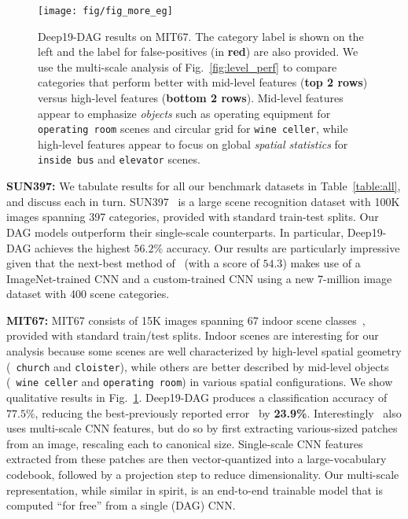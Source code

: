 \documentclass[10pt,twocolumn,letterpaper]{article}
\newcommand{\songfan}[1]{\textcolor{blue}{[Songfan: #1]}}
\begin{document}


\begin{figure}[t!]
\centering
	\texttt{[image: fig/fig\_more\_eg]}
\caption{Deep19-DAG results on MIT67. The category label is shown on the left and the label for false-positives (in {\bf red}) are also provided. We use the multi-scale analysis of Fig.~\ref{fig:level_perf} to compare categories that perform better with mid-level features ({\bf top 2 rows}) versus high-level features ({\bf bottom 2 rows}). Mid-level features appear to emphasize \textit{objects} such as operating equipment for {\tt operating room} scenes and circular grid for {\tt  wine celler}, while high-level features appear to focus on global \textit{spatial statistics} for {\tt inside bus} and {\tt elevator} scenes. }%
\label{fig:more_eg}
\end{figure}

{\bf SUN397:} We tabulate results for all our benchmark datasets in Table~\ref{table:all}, and discuss each in turn. SUN397~\cite{SUN397} is a large scene recognition dataset with 100K images spanning 397 categories, provided with standard train-test splits. Our DAG models outperform their single-scale counterparts. In particular, Deep19-DAG achieves the highest $56.2\%$ accuracy. Our results are particularly impressive given that the next-best method of~\cite{zhoulearning} (with a score of $54.3$) makes use of a ImageNet-trained CNN and a custom-trained CNN using a new 7-million image dataset with 400 scene categories.




{\bf MIT67:} MIT67 consists of 15K images spanning 67 indoor scene classes~\cite{MIT67}, provided with standard train/test splits. Indoor scenes are interesting for our analysis because some scenes are well characterized by high-level spatial geometry (\eg~{\tt church} and {\tt cloister}), while others are better described by mid-level objects (\eg~{\tt wine celler} and {\tt operating room}) in various spatial configurations. We show qualitative results in Fig.~\ref{fig:more_eg}. Deep19-DAG produces a classification accuracy of $77.5\%$, reducing the best-previously reported error~\cite{Gong14} by {\bf 23.9\%}. Interestingly~\cite{Gong14} also uses multi-scale CNN features, but do so by first extracting various-sized patches from an image, rescaling each to canonical size. Single-scale CNN features extracted from these patches are then vector-quantized into a large-vocabulary codebook, followed by a projection step to reduce dimensionality. Our multi-scale representation, while similar in spirit, is an end-to-end trainable model that is computed ``for free'' from a single (DAG) CNN.
\end{document}
